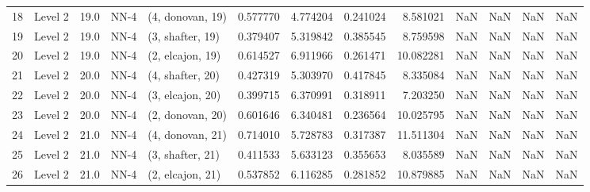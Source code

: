 \begin{tabular}{llrllrrrrrrrr}
18 &   Level 2 &   19.0 &        NN-4 &  (4, donovan, 19) &   0.577770 &   4.774204 &  0.241024 &   8.581021 &                  NaN &                    NaN &                 NaN &                   NaN \\
19 &   Level 2 &   19.0 &        NN-4 &  (3, shafter, 19) &   0.379407 &   5.319842 &  0.385545 &   8.759598 &                  NaN &                    NaN &                 NaN &                   NaN \\
20 &   Level 2 &   19.0 &        NN-4 &  (2, elcajon, 19) &   0.614527 &   6.911966 &  0.261471 &  10.082281 &                  NaN &                    NaN &                 NaN &                   NaN \\
21 &   Level 2 &   20.0 &        NN-4 &  (4, shafter, 20) &   0.427319 &   5.303970 &  0.417845 &   8.335084 &                  NaN &                    NaN &                 NaN &                   NaN \\
22 &   Level 2 &   20.0 &        NN-4 &  (3, elcajon, 20) &   0.399715 &   6.370991 &  0.318911 &   7.203250 &                  NaN &                    NaN &                 NaN &                   NaN \\
23 &   Level 2 &   20.0 &        NN-4 &  (2, donovan, 20) &   0.601646 &   6.340481 &  0.236564 &  10.025795 &                  NaN &                    NaN &                 NaN &                   NaN \\
24 &   Level 2 &   21.0 &        NN-4 &  (4, donovan, 21) &   0.714010 &   5.728783 &  0.317387 &  11.511304 &                  NaN &                    NaN &                 NaN &                   NaN \\
25 &   Level 2 &   21.0 &        NN-4 &  (3, shafter, 21) &   0.411533 &   5.633123 &  0.355653 &   8.035589 &                  NaN &                    NaN &                 NaN &                   NaN \\
26 &   Level 2 &   21.0 &        NN-4 &  (2, elcajon, 21) &   0.537852 &   6.116285 &  0.281852 &  10.879885 &                  NaN &                    NaN &                 NaN &                   NaN \\
\bottomrule
\end{tabular}
